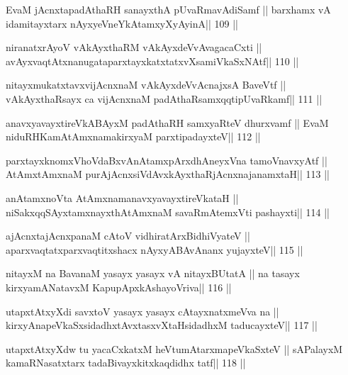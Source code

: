 \begin{shl}
EvaM jAcnxtapadAthaRH sanayxthA pUvaRmavAdiSamf ||
barxhamx vA idamitayxtarx nAyxyeVneYkAtamxyXyAyinA\hfill || 109 ||
\end{shl}

\begin{shl}
niranatxrAyoV vAkAyxthaRM vAkAyxdeVvAvagacaCxti ||
avAyxvaqtAtxnanugataparxtayxkatxtatxvXsamiVkaSxNAtf\hfill || 110 ||
\end{shl}

\begin{shl}
nitayxmukatxtavxvijAcnxnaM  vAkAyxdeVvAcnajxsA BaveVtf ||
vAkAyxthaRsayx ca vijAcnxnaM padAthaRsamxqqtipUvaRkamf\hfill || 111 ||
\end{shl}

\begin{shl}
anavxyavayxtireVkABAyxM padAthaRH samxyaRteV dhurxvamf ||
EvaM niduRHKamAtAmxnamakirxyaM parxtipadayxteV\hfill || 112 ||
\end{shl}

\begin{shl}
parxtayxknomxVhoVdaBxvAnAtamxpArxdhAneyxVna tamoVnavxyAtf ||
AtAmx\s\s tAmxnaM purA\s jAcnxsiVdAvxkAyxthaRjAcnxnajanamxtaH\hfill || 113 ||
\end{shl}

\begin{shl}
anAtamxnoV\s ta AtAmxnamanavxyavayxtireVkataH ||
niSakxqqSAyx\s\s tamxnayxthA\s\s tAmxnaM savaRmAtemxVti pashayxti\hfill || 114 ||
\end{shl}

\begin{shl}
ajAcnxtajAcnxpanaM cAtoV vidhiratArxBidhiVyateV ||
aparxvaqtatxparxvaqtitxshacx nAyxyABAvAnanx yujayxteV\hfill || 115 ||
\end{shl}

\begin{shl}
nitayxM na BavanaM yasayx yasayx vA nitayxBUtatA ||
na tasayx kirxyamANatavxM KapupApxkAshayoVriva\hfill || 116 ||
\end{shl}

\begin{shl}
utapxtAtxyXdi savxtoV yasayx yasayx cAtayxnatxmeVva na ||
kirxyAnapeVkaSxsidadhxtAvxtasxvXtaHsidadhxM taducayxteV\hfill || 117 ||
\end{shl}

\begin{shl}
utapxtAtxyXdw tu yacaCxkatxM heVtumAtarxmapeVkaSxteV ||
sAPalayxM kamaRNasatxtarx tadaBivayxkitxkaqdidhx tatf\hfill || 118 ||
\end{shl}

